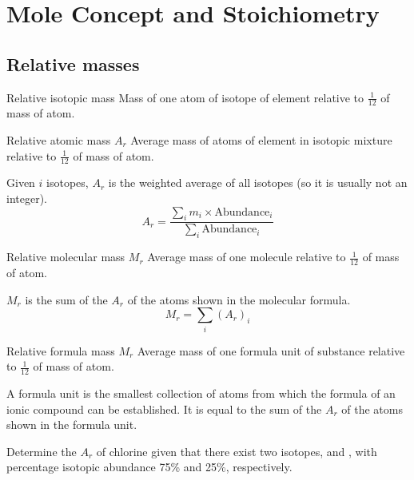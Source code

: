 \section{Mole Concept and Stoichiometry}
\subsection{Relative masses}
\begin{defn}{Relative isotopic mass}{}
Mass of one atom of isotope of element relative to $\frac{1}{12}$ of mass of  atom.
\end{defn}

\begin{defn}{Relative atomic mass $A_r$}{}
Average mass of atoms of element in isotopic mixture relative to $\frac{1}{12}$ of mass of  atom.
\end{defn}

Given $i$ isotopes, $A_r$ is the weighted average of all isotopes (so it is usually not an integer).
\begin{equation}
A_r = \frac{\sum_i m_i \times \text{Abundance}_i}{\sum_i \text{Abundance}_i}
\end{equation}

\begin{defn}{Relative molecular mass $M_r$}{}
Average mass of one molecule relative to $\frac{1}{12}$ of mass of  atom.
\end{defn}

$M_r$ is the sum of the $A_r$ of the atoms shown in the molecular formula.
\begin{equation}
M_r = \sum_i (A_r)_i
\end{equation}

\begin{defn}{Relative formula mass $M_r$}{}
Average mass of one formula unit of substance relative to $\frac{1}{12}$ of mass of  atom.
\end{defn}

\begin{remark}
A formula unit is the smallest collection of atoms from which the formula of an ionic compound can be established. It is equal to the sum of the $A_r$ of the atoms shown in the formula unit.
\end{remark}

\begin{exercise}{}{}
Determine the $A_r$ of chlorine given that there exist two isotopes,  and , with percentage isotopic abundance 75\% and 25\%, respectively.
\end{exercise}

